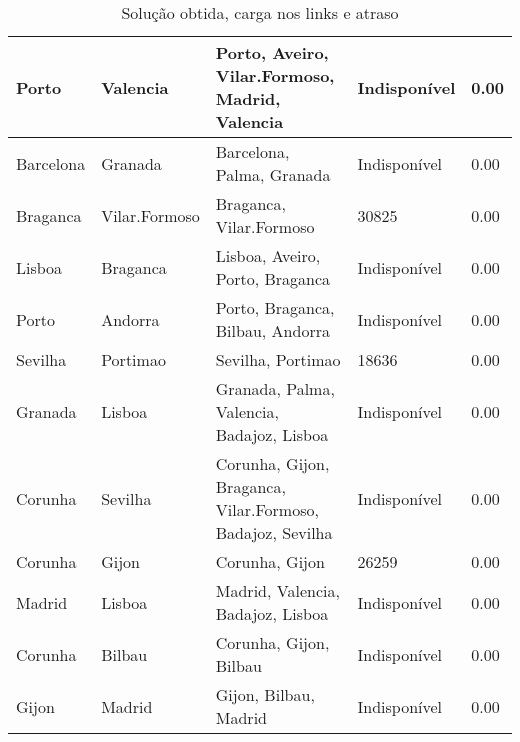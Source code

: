 \begin{table}[!htb]
{\begin{tabular}{|l|l|l|l|l|}
Porto & Valencia & Porto, Aveiro, Vilar.Formoso, Madrid, Valencia & Indisponível & 0.00 \\ \hline
Barcelona & Granada & Barcelona, Palma, Granada & Indisponível & 0.00 \\ \hline
Braganca & Vilar.Formoso & Braganca, Vilar.Formoso & 30825 & 0.00 \\ \hline
Lisboa & Braganca & Lisboa, Aveiro, Porto, Braganca & Indisponível & 0.00 \\ \hline
Porto & Andorra & Porto, Braganca, Bilbau, Andorra & Indisponível & 0.00 \\ \hline
Sevilha & Portimao & Sevilha, Portimao & 18636 & 0.00 \\ \hline
Granada & Lisboa & Granada, Palma, Valencia, Badajoz, Lisboa & Indisponível & 0.00 \\ \hline
Corunha & Sevilha & Corunha, Gijon, Braganca, Vilar.Formoso, Badajoz, Sevilha & Indisponível & 0.00 \\ \hline
Corunha & Gijon & Corunha, Gijon & 26259 & 0.00 \\ \hline
Madrid & Lisboa & Madrid, Valencia, Badajoz, Lisboa & Indisponível & 0.00 \\ \hline
Corunha & Bilbau & Corunha, Gijon, Bilbau & Indisponível & 0.00 \\ \hline
Gijon & Madrid & Gijon, Bilbau, Madrid & Indisponível & 0.00 \\ \hline
\end{tabular}}
\caption[]{Solução obtida, carga nos links e atraso}
\end{table}

\begin{table}[!htb]
        \centering
\caption[]{Solução obtida, carga nos links e atraso}
\end{table}

